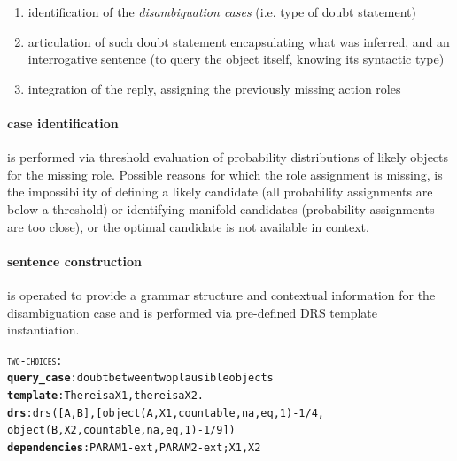 \documentclass[oribibl]{llncs}
\begin{document}
\begin{enumerate} %
    \item identification of the \textit{disambiguation cases}  (i.e. type of doubt statement)\\
    \item articulation of such doubt statement encapsulating what was inferred, and an interrogative sentence (to query the object itself, knowing its syntactic type) \\ 
    \item integration of the reply, assigning the previously missing action roles 
\end{enumerate}

\paragraph{case identification} is performed via threshold evaluation of probability distributions of likely objects for the missing role. 
Possible reasons for which the role assignment is missing, is the impossibility of 
defining a likely candidate (all probability assignments are below a threshold) or identifying manifold candidates (probability assignments are too close), or
the optimal candidate is not available in context.  

\paragraph{sentence construction} is operated to provide a grammar structure and contextual information for the disambiguation case and is performed via pre-defined DRS template instantiation. 
\begin{alltt}
{\large \textsc{two-choices}}:
    \textbf{query_case}: doubt between two plausible objects
    \textbf{template}: There is a X1, there is a X2.
    \textbf{drs}: drs([A,B],[object(A,X1,countable,na,eq,1)-1/4,
    object(B,X2,countable,na,eq,1)-1/9])
    \textbf{dependencies}: PARAM1-ext, PARAM2-ext; X1, X2
\end{alltt} 
\end{document}
